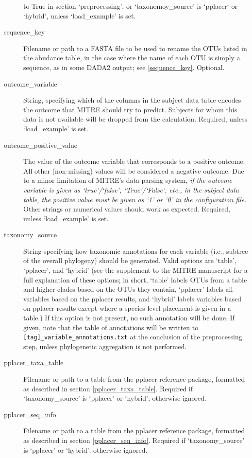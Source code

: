\documentclass[12pt]{report}
\begin{document}
\begin{description}
  to True in section `preprocessing', or `taxonomoy\_source' is
  `pplacer` or `hybrid', unless `load\_example' is set.
\item[sequence\_key]
  Filename or path to a FASTA file to be used to rename
  the OTUs listed in the abudance table, in the case where
  the name of each OTU is simply a sequence, as in some DADA2 output;
  see \ref{sequence_key}. Optional.
\item[outcome\_variable] String, specifying which of the columns in
  the subject data table encodes the outcome that MITRE should try to
  predict. Subjects for whom this data is not available will be
  dropped from the calculation.  Required, unless `load\_example' is
  set.
\item[outcome\_positive\_value] The value of the outcome variable that
  corresponds to a positive outcome. All other (non-missing) values
  will be considered a negative outcome. Due to a minor limitation of
  MITRE's data parsing system, \textit{if the outcome variable is
    given as `true'/`false', `True'/`False', etc., in the subject data
    table, the positive value must be given as `1' or `0' in the
    configuration file.}  Other strings or numerical values should
  work as expected. Required, unless `load\_example' is set.
  
\item[taxonomy\_source] String specifying how taxonomic annotations
  for each variable (i.e., subtree of the overall phylogeny) should be
  generated. Valid options are `table', `pplacer', and `hybrid' (see
  the supplement to the MITRE manuscript for a full explanation of
  these options; in short, `table' labels OTUs from a table and higher
  clades based on the OTUs they contain, `pplacer' labels all
  variables based on the pplacer results, and `hybrid' labels
  variables based on pplacer results except where a species-level
  placement is given in a table.) If this option is not present, no
  such annotation will be done. If given, note that the table of
  annotations will be written to
  \texttt{[tag]\_variable\_annotations.txt} at the conclusion of the
  preprocessing step, unless phylogenetic aggregation is not
  performed.
    
\item[pplacer\_taxa\_table] Filename or path to a table from the
  pplacer reference package, formatted as described in section
  \ref{pplacer_taxa_table}. Required if `taxonomy\_source' is
  `pplacer' or `hybrid'; otherwise ignored.
\item[pplacer\_seq\_info] Filename or path to a table from the pplacer
  reference package, formatted as described in section
  \ref{pplacer_seq_info}. Required if `taxonomy\_source' is `pplacer'
  or `hybrid'; otherwise ignored.


\end{description}
\end{document}
